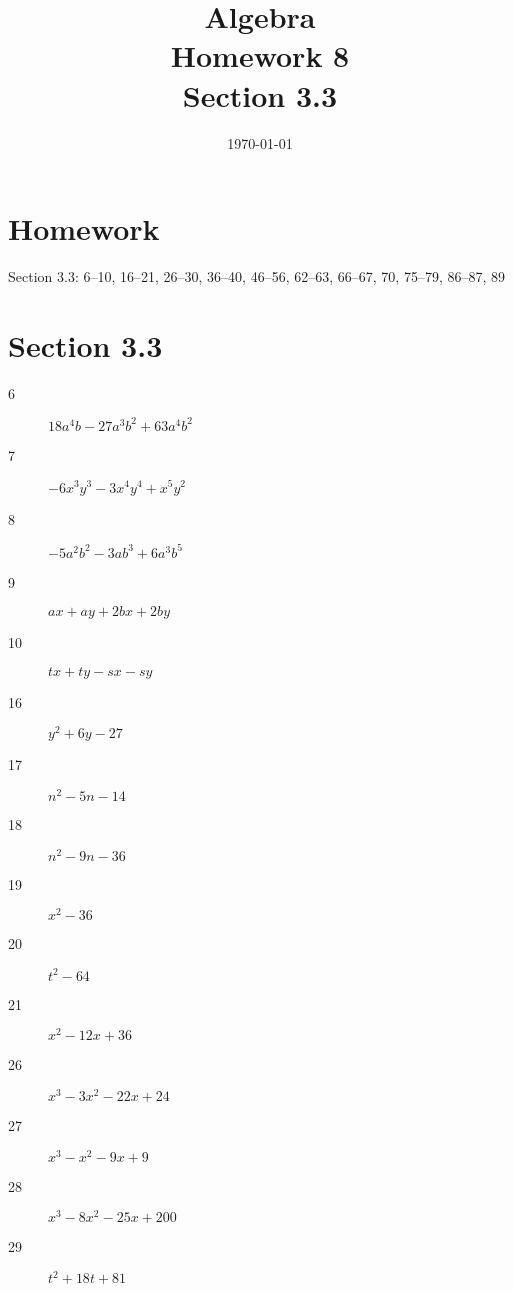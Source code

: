 \documentclass[letterpaper, landscape]{exam}
\title{Algebra \\ Homework 8 \\ Section 3.3 }
\author{}
\date{\today}
\begin{document}
  \maketitle

  \section{Homework}

  Section 3.3: 6--10, 16--21, 26--30, 36--40, 46--56, 62--63, 66--67, 70, 75--79, 86--87, 89


  \ifprintanswers{}
    \section{Section 3.3} %
    
    \begin{description}
      \item[6] $18 a^4 b - 27 a^3 b^2 + 63 a^4 b^2$ 

      \item[7] $-6x^3y^3 - 3x^4y^4 + x^5y^2$ 

      \item[8] $-5a^2b^2 - 3ab^3 + 6a^3b^5 $ 

      \item[9] $ax + ay + 2bx + 2by$

      \item[10] $tx + ty -sx - sy$

      \item[16] $y^2 + 6y - 27$

      \item[17] $n^2 - 5n - 14$

      \item[18] $n^2 - 9n - 36$

      \item[19] $x^2 - 36$

      \item[20] $t^2 - 64$

      \item[21] $x^2 - 12x + 36$

      \item[26] $x^3 - 3 x^2 - 22 x + 24$

      \item[27] $x^3 - x^2 - 9x + 9$

      \item[28] $x^3 - 8 x^2 - 25 x + 200$

      \item[29] $t^2 + 18t + 81$


\end{description}
\end{document}
